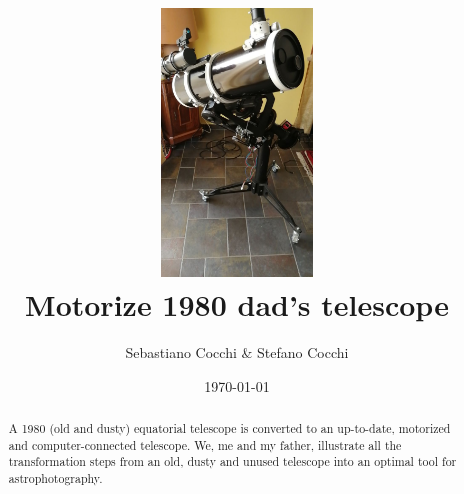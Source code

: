 \documentclass{article}
\title{\includegraphics[width=4cm]{telescope_image.jpg} \\ Motorize 1980 dad's telescope}
\author{Sebastiano Cocchi \& Stefano Cocchi}
\date{\today}
\begin{document}
    
    \maketitle

    \begin{abstract}
        A 1980 (old and dusty) equatorial telescope is converted to an up-to-date, motorized and computer-connected telescope.
        We, me and my father, illustrate all the transformation steps from an old, dusty and unused telescope into an optimal tool for astrophotography.
    \end{abstract}

\end{document}
